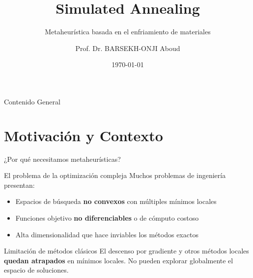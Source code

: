 \documentclass[aspectratio=169,xcolor=dvipsnames]{beamer}
\title{Simulated Annealing}
\subtitle{Metaheurística basada en el enfriamiento de materiales}
\author{Prof. Dr. BARSEKH-ONJI Aboud}
\institute{
    Facultad de Ingeniería \\
    Universidad Anáhuac México
}
\date{\today}
\begin{document}
\begin{frame}
    \titlepage
\end{frame}

\begin{frame}{Contenido General}
    \tableofcontents
\end{frame}

\section{Motivación y Contexto}

\begin{frame}{¿Por qué necesitamos metaheurísticas?}
    \begin{block}{El problema de la optimización compleja}
        Muchos problemas de ingeniería presentan:
        \begin{itemize}
            \item Espacios de búsqueda \textbf{no convexos} con múltiples mínimos locales
            \item Funciones objetivo \textbf{no diferenciables} o de cómputo costoso
            \item Alta dimensionalidad que hace inviables los métodos exactos
        \end{itemize}
    \end{block}
    \vspace{0.3cm}
    \begin{alertblock}{Limitación de métodos clásicos}
        El descenso por gradiente y otros métodos locales \textbf{quedan atrapados} en mínimos locales. No pueden explorar globalmente el espacio de soluciones.
    \end{alertblock}
\end{frame}
\end{document}

